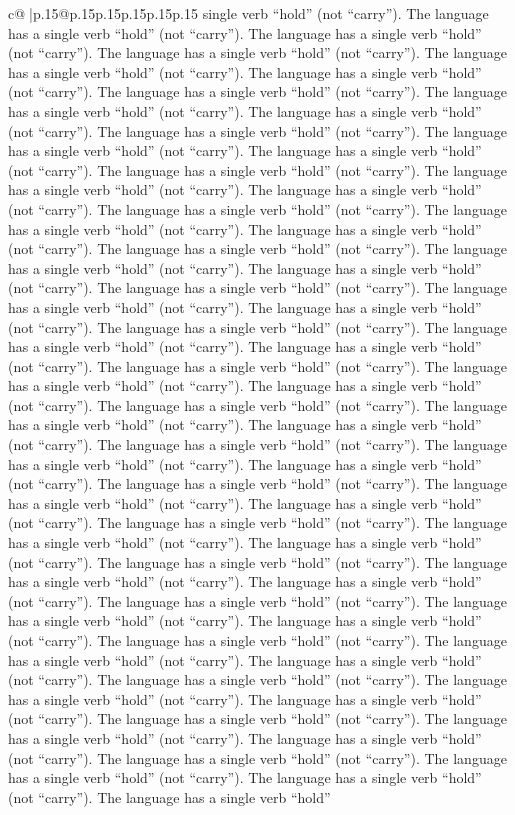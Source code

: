 \documentclass{article}
\begin{document}
{\begin{supertabular}{c@{$\;$}|p{.15\linewidth}@{}p{.15\linewidth}p{.15\linewidth}p{.15\linewidth}p{.15\linewidth}p{.15\linewidth}}
{{{single verb “hold” (not “carry”). The language has a single verb “hold” (not “carry”). The language has a single verb “hold” (not “carry”). The language has a single verb “hold” (not “carry”). The language has a single verb “hold” (not “carry”). The language has a single verb “hold” (not “carry”). The language has a single verb “hold” (not “carry”). The language has a single verb “hold” (not “carry”). The language has a single verb “hold” (not “carry”). The language has a single verb “hold” (not “carry”). The language has a single verb “hold” (not “carry”). The language has a single verb “hold” (not “carry”). The language has a single verb “hold” (not “carry”). The language has a single verb “hold” (not “carry”). The language has a single verb “hold” (not “carry”). The language has a single verb “hold” (not “carry”). The language has a single verb “hold” (not “carry”). The language has a single verb “hold” (not “carry”). The language has a single verb “hold” (not “carry”). The language has a single verb “hold” (not “carry”). The language has a single verb “hold” (not “carry”). The language has a single verb “hold” (not “carry”). The language has a single verb “hold” (not “carry”). The language has a single verb “hold” (not “carry”). The language has a single verb “hold” (not “carry”). The language has a single verb “hold” (not “carry”). The language has a single verb “hold” (not “carry”). The language has a single verb “hold” (not “carry”). The language has a single verb “hold” (not “carry”). The language has a single verb “hold” (not “carry”). The language has a single verb “hold” (not “carry”). The language has a single verb “hold” (not “carry”). The language has a single verb “hold” (not “carry”). The language has a single verb “hold” (not “carry”). The language has a single verb “hold” (not “carry”). The language has a single verb “hold” (not “carry”). The language has a single verb “hold” (not “carry”). The language has a single verb “hold” (not “carry”). The language has a single verb “hold” (not “carry”). The language has a single verb “hold” (not “carry”). The language has a single verb “hold” (not “carry”). The language has a single verb “hold” (not “carry”). The language has a single verb “hold” (not “carry”). The language has a single verb “hold” (not “carry”). The language has a single verb “hold” (not “carry”). The language has a single verb “hold” (not “carry”). The language has a single verb “hold” (not “carry”). The language has a single verb “hold” (not “carry”). The language has a single verb “hold” (not “carry”). The language has a single verb “hold” (not “carry”). The language has a single verb “hold” (not “carry”). The language has a single verb “hold” (not “carry”). The language has a single verb “hold” (not “carry”). The language has a single verb “hold” (not “carry”). The language has a single verb “hold” (not “carry”). The language has a single verb “hold” (not “carry”). The language has a single verb “hold” (not “carry”). The language has a single verb “hold” (not “carry”). The language has a single verb “hold” (not “carry”). The language has a single verb “hold” (not “carry”). The language has a single verb “hold” }}}
\end{supertabular}}
\end{document}
